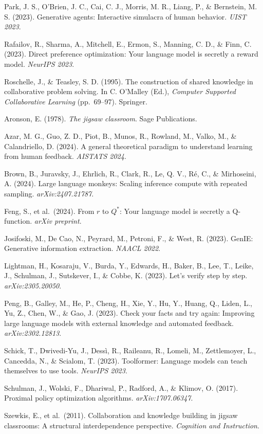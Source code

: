 \documentclass[
  11pt,
]{article}
\begin{document}
Park, J. S., O'Brien, J. C., Cai, C. J., Morris, M. R., Liang, P., \&
Bernstein, M. S. (2023). Generative agents: Interactive simulacra of
human behavior. \emph{UIST 2023}.

Rafailov, R., Sharma, A., Mitchell, E., Ermon, S., Manning, C. D., \&
Finn, C. (2023). Direct preference optimization: Your language model is
secretly a reward model. \emph{NeurIPS 2023}.

Roschelle, J., \& Teasley, S. D. (1995). The construction of shared
knowledge in collaborative problem solving. In C. O'Malley (Ed.),
\emph{Computer Supported Collaborative Learning} (pp.~69--97). Springer.

Aronson, E. (1978). \emph{The jigsaw classroom}. Sage Publications.

Azar, M. G., Guo, Z. D., Piot, B., Munos, R., Rowland, M.,
Valko, M., \& Calandriello, D. (2024). A general theoretical paradigm to
understand learning from human feedback. \emph{AISTATS 2024}.

Brown, B., Juravsky, J., Ehrlich, R., Clark, R., Le, Q. V., Ré,
C., \& Mirhoseini, A. (2024). Large language monkeys: Scaling inference
compute with repeated sampling. \emph{arXiv:2407.21787}.

Feng, S., et al.~(2024). From \(r\) to \(Q^*\): Your language
model is secretly a Q-function. \emph{arXiv preprint}.

Josifoski, M., De Cao, N., Peyrard, M., Petroni, F., \& West,
R. (2023). GenIE: Generative information extraction. \emph{NAACL 2022}.

Lightman, H., Kosaraju, V., Burda, Y., Edwards, H., Baker, B.,
Lee, T., Leike, J., Schulman, J., Sutskever, I., \& Cobbe, K. (2023).
Let's verify step by step. \emph{arXiv:2305.20050}.

Peng, B., Galley, M., He, P., Cheng, H., Xie, Y., Hu, Y.,
Huang, Q., Liden, L., Yu, Z., Chen, W., \& Gao, J. (2023). Check your
facts and try again: Improving large language models with external
knowledge and automated feedback. \emph{arXiv:2302.12813}.

Schick, T., Dwivedi-Yu, J., Dessì, R., Raileanu, R., Lomeli,
M., Zettlemoyer, L., Cancedda, N., \& Scialom, T. (2023). Toolformer:
Language models can teach themselves to use tools. \emph{NeurIPS 2023}.

Schulman, J., Wolski, F., Dhariwal, P., Radford, A., \& Klimov,
O. (2017). Proximal policy optimization algorithms. \emph{arXiv:1707.06347}.

Szewkis, E., et al.~(2011). Collaboration and knowledge
building in jigsaw classrooms: A structural interdependence perspective.
\emph{Cognition and Instruction}.
\end{document}
